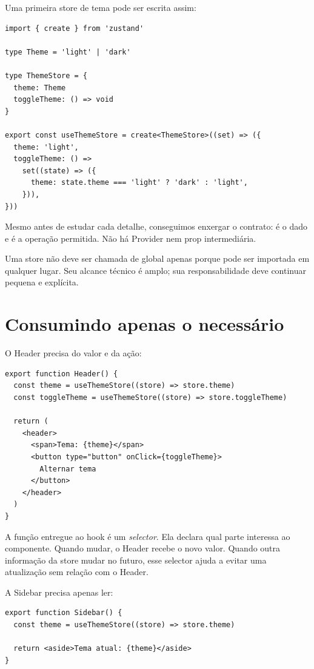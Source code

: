 Uma primeira store de tema pode ser escrita assim:

\begin{lstlisting}[caption={Uma store pequena de tema.},label={lst:theme-store}]
import { create } from 'zustand'

type Theme = 'light' | 'dark'

type ThemeStore = {
  theme: Theme
  toggleTheme: () => void
}

export const useThemeStore = create<ThemeStore>((set) => ({
  theme: 'light',
  toggleTheme: () =>
    set((state) => ({
      theme: state.theme === 'light' ? 'dark' : 'light',
    })),
}))
\end{lstlisting}

Mesmo antes de estudar cada detalhe, conseguimos enxergar o contrato:
 é o dado e  é a operação permitida. Não há
Provider nem prop intermediária.

\begin{decisao}
Uma store não deve ser chamada de global apenas porque pode ser importada em
qualquer lugar. Seu alcance técnico é amplo; sua responsabilidade deve continuar
pequena e explícita.
\end{decisao}

\section{Consumindo apenas o necessário}

O Header precisa do valor e da ação:

\begin{lstlisting}
export function Header() {
  const theme = useThemeStore((store) => store.theme)
  const toggleTheme = useThemeStore((store) => store.toggleTheme)

  return (
    <header>
      <span>Tema: {theme}</span>
      <button type="button" onClick={toggleTheme}>
        Alternar tema
      </button>
    </header>
  )
}
\end{lstlisting}

A função entregue ao hook é um \emph{selector}. Ela declara qual parte interessa
ao componente. Quando  mudar, o Header recebe o novo valor. Quando
outra informação da store mudar no futuro, esse selector ajuda a evitar uma
atualização sem relação com o Header.

A Sidebar precisa apenas ler:

\begin{lstlisting}
export function Sidebar() {
  const theme = useThemeStore((store) => store.theme)

  return <aside>Tema atual: {theme}</aside>
}
\end{lstlisting}

